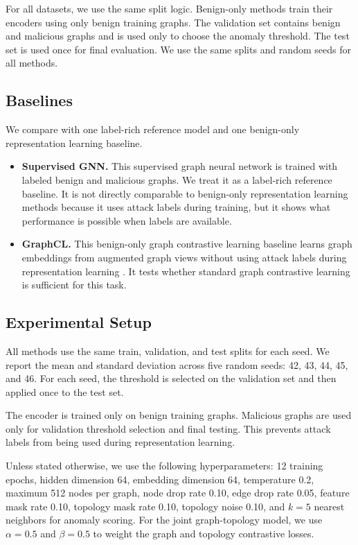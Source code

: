 For all datasets, we use the same split logic. Benign-only methods train their encoders using only benign training graphs. The validation set contains benign and malicious graphs and is used only to choose the anomaly threshold. The test set is used once for final evaluation. We use the same splits and random seeds for all methods.

\subsection{Baselines}

We compare \sysname{} with one label-rich reference model and one benign-only representation learning baseline.

\begin{itemize}
    \item \textbf{Supervised GNN.} This supervised graph neural network is trained with labeled benign and malicious graphs. We treat it as a label-rich reference baseline. It is not directly comparable to benign-only representation learning methods because it uses attack labels during training, but it shows what performance is possible when labels are available.

    \item \textbf{GraphCL.} This benign-only graph contrastive learning baseline learns graph embeddings from augmented graph views without using attack labels during representation learning \cite{you2020graphcl}. It tests whether standard graph contrastive learning is sufficient for this task.
\end{itemize}

\subsection{Experimental Setup}

All methods use the same train, validation, and test splits for each seed. We report the mean and standard deviation across five random seeds: 42, 43, 44, 45, and 46. For each seed, the threshold is selected on the validation set and then applied once to the test set.

The encoder is trained only on benign training graphs. Malicious graphs are used only for validation threshold selection and final testing. This prevents attack labels from being used during representation learning.

Unless stated otherwise, we use the following hyperparameters: 12 training epochs, hidden dimension 64, embedding dimension 64, temperature 0.2, maximum 512 nodes per graph, node drop rate 0.10, edge drop rate 0.05, feature mask rate 0.10, topology mask rate 0.10, topology noise 0.10, and $k=5$ nearest neighbors for anomaly scoring. For the joint graph-topology model, we use $\alpha=0.5$ and $\beta=0.5$ to weight the graph and topology contrastive losses.

